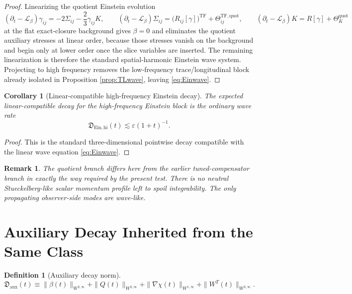 \documentclass[11pt]{article}
\newcommand{\Ell}{\mathcal{L}}
\newtheorem{definition}{Definition}
\newtheorem{remark}{Remark}
\newtheorem{corollary}{Corollary}
\begin{document}
\begin{proof}
Linearizing the quotient Einstein evolution
\[
(\partial_t-\Ell_\beta)\gamma_{ij}
=
-2\Sigma_{ij}
-\frac23\gamma_{ij}K,
\qquad
(\partial_t-\Ell_\beta)\Sigma_{ij}
=
\bigl(R_{ij}[\gamma]\bigr)^{\mathrm{TF}}
+\Theta_{ij}^{\mathrm{TF,quot}},
\qquad
(\partial_t-\Ell_\beta)K
=
R[\gamma]+\Theta_K^{\mathrm{quot}}
\]
at the flat exact-closure background gives \(\beta=0\) and eliminates the quotient auxiliary stresses at linear order, because those stresses vanish on the background and begin only at lower order once the slice variables are inserted. The remaining linearization is therefore the standard spatial-harmonic Einstein wave system. Projecting to high frequency removes the low-frequency trace/longitudinal block already isolated in Proposition \ref{prop:TLwave}, leaving \eqref{eq:Einwave}.
\end{proof}

\begin{corollary}[Linear-compatible high-frequency Einstein decay]
\label{cor:Eindecay}
The expected linear-compatible decay for the high-frequency Einstein block is the ordinary wave rate
\begin{equation}
\mathfrak D_{\mathrm{Ein,hi}}(t)\lesssim \varepsilon(1+t)^{-1}.
\label{eq:Einrate}
\end{equation}
\end{corollary}

\begin{proof}
This is the standard three-dimensional pointwise decay compatible with the linear wave equation \eqref{eq:Einwave}.
\end{proof}

\begin{remark}
The quotient branch differs here from the earlier tuned-compensator branch in exactly the way required by the present test. There is no neutral Stueckelberg-like scalar momentum profile left to spoil integrability. The only propagating observer-side modes are wave-like.
\end{remark}

\section{Auxiliary Decay Inherited from the Same Class}

\begin{definition}[Auxiliary decay norm]
\begin{equation}
\mathfrak D_{\mathrm{aux}}(t)
\equiv
\|\beta(t)\|_{W^{2,\infty}}
+ \|Q(t)\|_{W^{2,\infty}}
+ \|\nabla\chi(t)\|_{W^{1,\infty}}
+ \|W^T(t)\|_{W^{2,\infty}}.
\label{eq:Daux}
\end{equation}
\end{definition}
\end{document}
